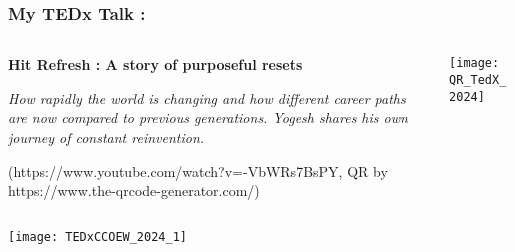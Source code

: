 \begin{frame}[fragile]\frametitle{My TEDx Talk : }
\begin{columns}
    \begin{column}[T]{0.6\linewidth}
	\textbf{Hit Refresh : A story of purposeful resets}
	
{\it 
How rapidly the world is changing and how different career paths are now compared to previous generations. Yogesh shares his own journey of constant reinvention.}
			
		{\tiny (https://www.youtube.com/watch?v=-VbWRs7BsPY, QR by https://www.the-qrcode-generator.com/)}
			
    \end{column}
    \begin{column}[T]{0.4\linewidth}
		\begin{center}
		\texttt{[image: QR\_TedX\_2024]}
		\end{center}	
    \end{column}
  \end{columns}
  
  		\begin{center}
		\texttt{[image: TEDxCCOEW\_2024\_1]}
		\end{center}
\end{frame}